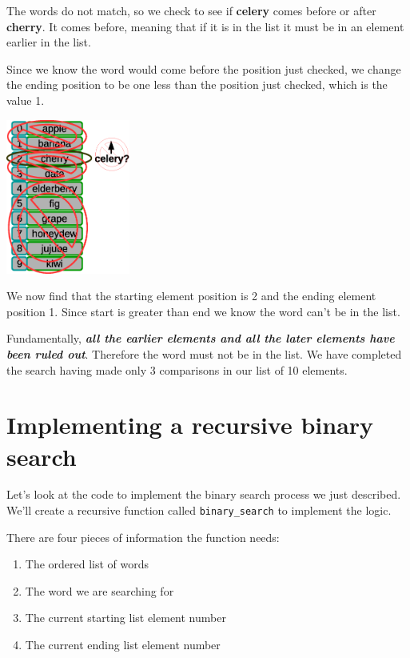 The words do not match, so we check to see if \textbf{celery} comes before or after \textbf{cherry}. It comes before, meaning that if it is in the list it must be in an element earlier in the list. 

Since we know the word would come before the position just checked, we change the ending position to be one less than the position just checked, which is the value 1. 

\beforefig
\centerline{\includegraphics[height=2in]{figs2/recursion-binsearch-failure-6.eps}}
\afterfig

We now find that the starting element position is 2 and the ending element position 1. Since start is greater than end we know the word can't be in the list. 

Fundamentally, \textbf{\textit{all the earlier elements and all the later elements have been ruled out}}. Therefore the word must not be in the list. We have completed the search having made only 3 comparisons in our list of 10 elements.

\section{Implementing a recursive binary search}

Let's look at the code to implement the binary search process we just described. We'll create a recursive function called \texttt{binary\_search} to implement the logic.


There are four pieces of information the function needs:

\begin{enumerate}
	\item The ordered list of words
	\item The word we are searching for
	\item The current starting list element number
	\item The current ending list element number
\end{enumerate}

